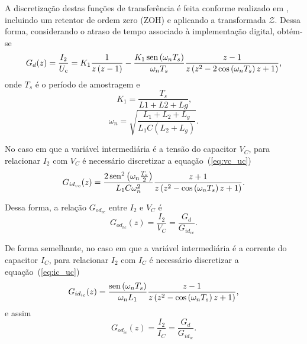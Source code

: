   A discretização destas funções de transferência é feita conforme realizado em \cite{ref:PARKER}, incluindo um retentor de ordem zero (ZOH) e aplicando a transformada $\mathcal{Z}$. Dessa forma, considerando o atraso de tempo associado à implementação digital, obtém-se
  \begin{equation}
    G_d (z) = \frac{I_2}{U_c} = K_1 \frac{1}{z \left( z-1 \right)}
    - \frac{K_1 \operatorname{sen} \left( \omega_n T_s \right) }{\omega_n T_s}
    \frac{z-1}{z \left( z^2 - 2 \cos\left( \omega_n T_s \right) z +1 \right) }
    \text{,}
  \end{equation}
  onde $T_s$ é o período de amostragem e
  \begin{equation}
    K_1 = \frac{T_s}{L1 + L2 + Lg} \text{,}
  \end{equation}
  \begin{equation}
    \omega_n = \sqrt{\frac{ L_1 + L_2 + L_g }{ L_1 C \left( L_2 + L_g \right)}}
    \text{.}
  \end{equation}

  No caso em que a variável intermediária é a tensão do capacitor $V_C$, para relacionar $I_2$ com $V_C$ é necessário discretizar a equação~(\ref{eq:vc_uc})
  \begin{equation}
    G_{id_{vc}}(z) = \frac{2 \operatorname{sen}^2 \left( \omega_n \frac{T_s}{2} \right)}{L_1 C \omega_n^2}
      \frac{z+1}{z \left( z^2 - \cos \left( \omega_n T_s \right) z + 1 \right)}
      \text{.}
  \end{equation}

  Dessa forma, a relação $G_{od_{vc}}$ entre $I_2$ e $V_C$ é
  \begin{equation}
    G_{od_{vc}}(z) = \frac{I_2}{V_C} = \frac{G_d}{G_{id_{vc}}} \text{.}
    \label{eq:god_i2_vc}
  \end{equation}

  De forma semelhante, no caso em que a variável intermediária é a corrente do capacitor $I_C$, para relacionar $I_2$ com $I_C$ é necessário discretizar a equação~(\ref{eq:ic_uc})
  \begin{equation}
    G_{id_{ic}}(z) = \frac{\operatorname{sen} \left( \omega_n T_s \right)}{\omega_n L_1}
      \frac{z-1}{z \left( z^2 - \cos \left( \omega_n T_s \right) z + 1 \right)}
      \text{,}
  \end{equation}
  e assim
  \begin{equation}
    G_{od_{ic}}(z) = \frac{I_2}{I_C} = \frac{G_d}{G_{id_{ic}}} \text{.}
    \label{eq:god_i2_ic}
  \end{equation}


